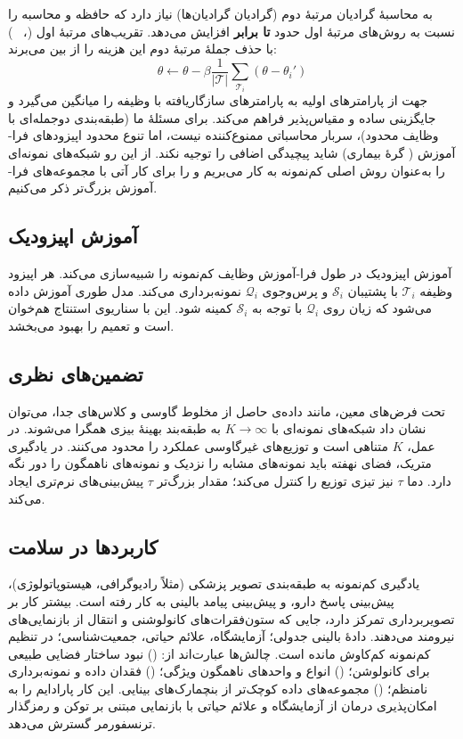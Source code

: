  به محاسبۀ گرادیان مرتبۀ دوم (گرادیان گرادیان‌ها) نیاز دارد که حافظه و محاسبه را نسبت به روش‌های مرتبۀ اول حدود \textbf{ تا  برابر} افزایش می‌دهد. تقریب‌های مرتبۀ اول (، ~\cite{nichol2018reptile}) با حذف جملۀ مرتبۀ دوم این هزینه را از بین می‌برند:
\begin{equation}
\theta \gets \theta - \beta \frac{1}{|\mathcal{T}|} \sum_{\mathcal{T}_i} (\theta - \theta_i')
\end{equation}
 جهت از پارامترهای اولیه به پارامترهای سازگاریافته با وظیفه را میانگین می‌گیرد و جایگزینی ساده و مقیاس‌پذیر فراهم می‌کند. برای مسئلۀ ما (طبقه‌بندی دوجمله‌ای با وظایف محدود)، سربار محاسباتی  ممنوع‌کننده نیست، اما تنوع محدود اپیزودهای فرا-آموزش ( گرۀ بیماری) شاید پیچیدگی اضافی را توجیه نکند. از این رو شبکه‌های نمونه‌ای را به‌عنوان روش اصلی کم‌نمونه به کار می‌بریم و  را برای کار آتی با مجموعه‌های فرا-آموزش بزرگ‌تر ذکر می‌کنیم.

\subsection{آموزش اپیزودیک}

آموزش اپیزودیک در طول فرا-آموزش وظایف کم‌نمونه را شبیه‌سازی می‌کند. هر اپیزود وظیفه $\mathcal{T}_i$ با پشتیبان $\mathcal{S}_i$ و پرس‌وجوی $\mathcal{Q}_i$ نمونه‌برداری می‌کند. مدل طوری آموزش داده می‌شود که زیان روی $\mathcal{Q}_i$ با توجه به $\mathcal{S}_i$ کمینه شود. این با سناریوی استنتاج هم‌خوان است و تعمیم را بهبود می‌بخشد.

\subsection{تضمین‌های نظری}

تحت فرض‌های معین، مانند داده‌ی حاصل از مخلوط گاوسی و کلاس‌های جدا، می‌توان نشان داد شبکه‌های نمونه‌ای با $K \to \infty$ به طبقه‌بند بهینۀ بیزی همگرا می‌شوند. در عمل، $K$ متناهی است و توزیع‌های غیرگاوسی عملکرد را محدود می‌کنند. در یادگیری متریک، فضای نهفته باید نمونه‌های مشابه را نزدیک و نمونه‌های ناهمگون را دور نگه دارد. دما $\tau$ نیز تیزی توزیع  را کنترل می‌کند؛ مقدار بزرگ‌تر \(\tau\) پیش‌بینی‌های نرم‌تری ایجاد می‌کند.

\subsection{کاربردها در سلامت}

یادگیری کم‌نمونه به طبقه‌بندی تصویر پزشکی (مثلاً رادیوگرافی، هیستوپاتولوژی)، پیش‌بینی پاسخ دارو، و پیش‌بینی پیامد بالینی به کار رفته است. بیشتر کار بر تصویربرداری تمرکز دارد، جایی که ستون‌فقرات‌های کانولوشنی و انتقال از  بازنمایی‌های نیرومند می‌دهند. دادۀ بالینی جدولی؛ آزمایشگاه، علائم حیاتی، جمعیت‌شناسی؛ در تنظیم کم‌نمونه کم‌کاوش مانده است. چالش‌ها عبارت‌اند از: () نبود ساختار فضایی طبیعی برای کانولوشن؛ () انواع و واحدهای ناهمگون ویژگی؛ () فقدان داده و نمونه‌برداری نامنظم؛ () مجموعه‌های داده کوچک‌تر از بنچمارک‌های بینایی. این کار پارادایم را به امکان‌پذیری درمان از آزمایشگاه و علائم حیاتی با بازنمایی مبتنی بر توکن و رمزگذار ترنسفورمر گسترش می‌دهد.

